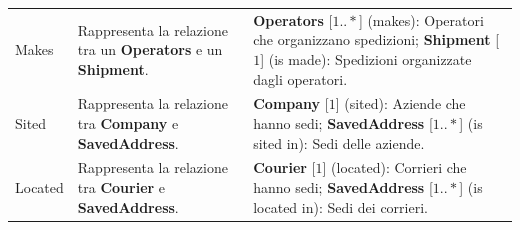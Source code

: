 \begin{tabularx}{\textwidth}{YYY}
  Makes &
  \begin{minipage}[c]{\linewidth}
    \vspace{0.5cm}
    Rappresenta la relazione tra un \textbf{Operators} e un \textbf{Shipment}. \newline
  \end{minipage} &
  \begin{minipage}[c]{\linewidth}
    \vspace{0.5cm}
    \textbf{Operators} [\(1..*\)]  (makes): Operatori che organizzano spedizioni; \newline
    \textbf{Shipment} [\(1\)] (is made): Spedizioni organizzate dagli operatori. \newline
  \end{minipage} \\

  Sited &
  \begin{minipage}[c]{\linewidth}
    \vspace{0.5cm}
    Rappresenta la relazione tra \textbf{Company} e \textbf{SavedAddress}. \newline
  \end{minipage} &
  \begin{minipage}[c]{\linewidth}
    \vspace{0.5cm}
    \textbf{Company} [\(1\)]  (sited): Aziende che hanno sedi; \newline
    \textbf{SavedAddress} [\(1..*\)] (is sited in): Sedi delle aziende. \newline
  \end{minipage} \\

  Located &
  \begin{minipage}[c]{\linewidth}
    \vspace{0.5cm}
    Rappresenta la relazione tra \textbf{Courier} e \textbf{SavedAddress}. \newline
  \end{minipage} &
  \begin{minipage}[c]{\linewidth}
    \vspace{0.5cm}
    \textbf{Courier} [\(1\)]  (located): Corrieri che hanno sedi; \newline
    \textbf{SavedAddress} [\(1..*\)] (is located in): Sedi dei corrieri. \newline
  \end{minipage} \\


\end{tabularx}
